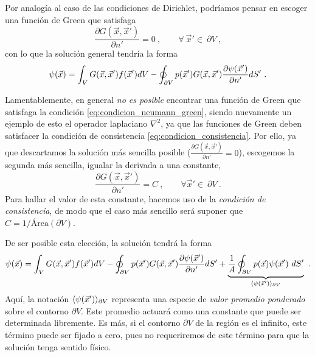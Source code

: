 Por analogía al caso de las condiciones de Dirichlet, podríamos pensar en escoger una función de Green que satisfaga
\begin{equation} \label{eq:condicion_neumann_green}
    \frac{\partial G(\vec{x}, \vec{x}')}{\partial n'} = 0 \ , \qquad \forall \ \vec{x}' \in \ \partial V \ ,
\end{equation}
con lo que la solución general tendría la forma
\begin{equation}\label{eq:solucion_neumann}
    \psi(\vec{x}) = \int_V G(\vec{x}, \vec{x}') f(\vec{x}') dV - \oint_{\partial V} p(\vec{x} ') G(\vec{x}, \vec{x}') \frac{\partial \psi(\vec{x}')}{\partial n'} dS' \ .
\end{equation}

Lamentablemente, en general \emph{no es posible} encontrar una función de Green que satisfaga la condición \eqref{eq:condicion_neumann_green}, siendo nuevamente un ejemplo de esto el operador laplaciano $\nabla^2$, ya que las funciones de Green deben satisfacer la condición de consistencia \eqref{eq:condicion_consistencia}. Por ello, ya que descartamos la solución más sencilla posible ($\frac{\partial G(\vec{x}, \vec{x}')}{\partial n'} = 0$), escogemos la segunda más sencilla, igualar la derivada a una constante,
\begin{equation}
    \frac{\partial G(\vec{x}, \vec{x}')}{\partial n'} = C \ , \qquad \forall \vec{x}' \in \ \partial V \ .
\end{equation}
Para hallar el valor de esta constante, hacemos uso de la \emph{condición de consistencia}, de modo que el caso más sencillo será suponer que $C = 1/\text{Área}(\partial V)$.

De ser posible esta elección, la solución tendrá la forma
\begin{equation}\label{eq:solucion_neumann}
    \psi(\x) = \int_V G(\x, \x') f(\x') dV - \oint_{\partial V} p(\x ') G(\x, \x') \frac{\partial \psi(\x')}{\partial n'} dS' + \underbrace{\frac{1}{A} \oint_{\partial V} p(\x) \psi(\x') \ dS'}_{\langle \psi(\x') \rangle_{\partial V}} \ .
\end{equation}
Aquí, la notación $\langle \psi(\vec{x}') \rangle_{\partial V}$ representa una especie de \emph{valor promedio ponderado} sobre el contorno $\partial V$. Este promedio actuará como una constante que puede ser determinada libremente. Es más, si el contorno $\partial V$ de la región es el infinito, este término puede ser fijado a cero, pues no requeriremos de este término para que la solución tenga sentido físico.

